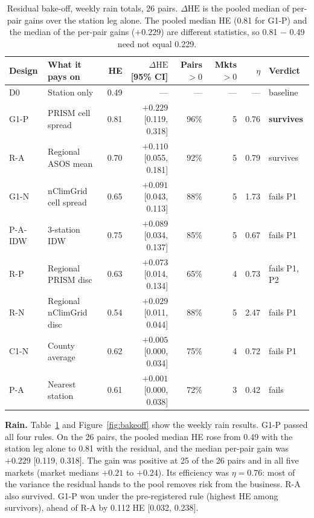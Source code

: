 \documentclass[11pt]{article}
\newcommand{\dHE}{\Delta\mathrm{HE}}
\begin{document}
\begin{table}[ht]
\centering
\small
\caption{Residual bake-off, weekly rain totals, 26 pairs. $\dHE$ is the pooled median of per-pair gains over the station leg alone. The pooled median HE (0.81 for G1-P) and the median of the per-pair gains ($+0.229$) are different statistics, so 0.81 $-$ 0.49 need not equal 0.229.}
\label{tab:rain}
\footnotesize
\setlength{\tabcolsep}{3.5pt}
\begin{tabular}{llrrrrrl}
\toprule
Design & What it pays on & HE & $\dHE$ [95\% CI] & Pairs $>0$ & Mkts $>0$ & $\eta$ & Verdict \\
\midrule
D0 & Station only & 0.49 & --- & --- & --- & --- & baseline \\
G1-P & PRISM cell spread & 0.81 & $+0.229$ [0.119, 0.318] & 96\% & 5 & 0.76 & \textbf{survives} \\
R-A & Regional ASOS mean & 0.70 & $+0.110$ [0.055, 0.181] & 92\% & 5 & 0.79 & survives \\
G1-N & nClimGrid cell spread & 0.65 & $+0.091$ [0.043, 0.113] & 88\% & 5 & 1.73 & fails P1 \\
P-A-IDW & 3-station IDW & 0.75 & $+0.089$ [0.034, 0.137] & 85\% & 5 & 0.67 & fails P1 \\
R-P & Regional PRISM disc & 0.63 & $+0.073$ [0.014, 0.134] & 65\% & 4 & 0.73 & fails P1, P2 \\
R-N & Regional nClimGrid disc & 0.54 & $+0.029$ [0.011, 0.044] & 88\% & 5 & 2.47 & fails P1 \\
C1-N & County average & 0.62 & $+0.005$ [0.000, 0.034] & 75\% & 4 & 0.72 & fails P1 \\
P-A & Nearest station & 0.61 & $+0.001$ [0.000, 0.038] & 72\% & 3 & 0.42 & fails \\
\bottomrule
\end{tabular}
\end{table}

\textbf{Rain.} Table~\ref{tab:rain} and Figure~\ref{fig:bakeoff} show the weekly rain results. G1-P passed all four rules. On the 26 pairs, the pooled median HE rose from 0.49 with the station leg alone to 0.81 with the residual, and the median per-pair gain was $+0.229$ [0.119, 0.318]. The gain was positive at 25 of the 26 pairs and in all five markets (market medians $+0.21$ to $+0.24$). Its efficiency was $\eta = 0.76$: most of the variance the residual hands to the pool removes risk from the business. R-A also survived. G1-P won under the pre-registered rule (highest HE among survivors), ahead of R-A by 0.112 HE [0.032, 0.238].
\end{document}
